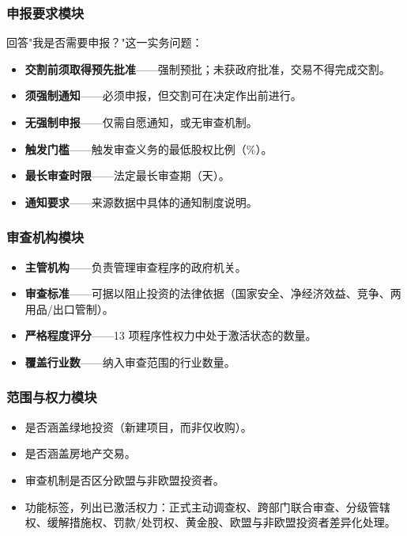 \documentclass[12pt,a4paper]{article}
\begin{document}
\subsubsection{申报要求模块}

回答"我是否需要申报？"这一实务问题：

\begin{itemize}
  \item \textbf{交割前须取得预先批准}——强制预批；未获政府批准，交易不得完成交割。
  \item \textbf{须强制通知}——必须申报，但交割可在决定作出前进行。
  \item \textbf{无强制申报}——仅需自愿通知，或无审查机制。
  \item \textbf{触发门槛}——触发审查义务的最低股权比例（\%）。
  \item \textbf{最长审查时限}——法定最长审查期（天）。
  \item \textbf{通知要求}——来源数据中具体的通知制度说明。
\end{itemize}

\subsubsection{审查机构模块}

\begin{itemize}
  \item \textbf{主管机构}——负责管理审查程序的政府机关。
  \item \textbf{审查标准}——可据以阻止投资的法律依据（国家安全、净经济效益、竞争、两用品/出口管制）。
  \item \textbf{严格程度评分}——13 项程序性权力中处于激活状态的数量。
  \item \textbf{覆盖行业数}——纳入审查范围的行业数量。
\end{itemize}

\subsubsection{范围与权力模块}

\begin{itemize}
  \item 是否涵盖绿地投资（新建项目，而非仅收购）。
  \item 是否涵盖房地产交易。
  \item 审查机制是否区分欧盟与非欧盟投资者。
  \item 功能标签，列出已激活权力：正式主动调查权、跨部门联合审查、分级管辖权、缓解措施权、罚款/处罚权、黄金股、欧盟与非欧盟投资者差异化处理。
\end{itemize}
\end{document}
